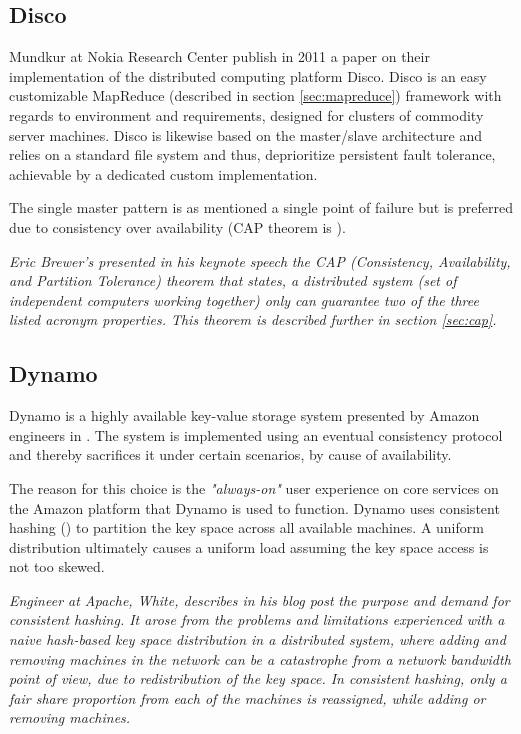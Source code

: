 \subsection*{Disco}
Mundkur \etal at Nokia Research Center publish in 2011 a paper on their implementation of the distributed computing platform Disco\cite{PageDisco}\cite{Mundkur:2011:DCP:2034654.2034670}. Disco is an easy customizable MapReduce (described in section \ref{sec:mapreduce}) framework with regards to environment and requirements, designed for clusters of commodity server machines. Disco is likewise based on the master/slave architecture and relies on a standard file system and thus, deprioritize persistent fault tolerance, achievable by a dedicated custom implementation. 

The single master pattern is as mentioned a single point of failure but is preferred due to consistency over availability (CAP theorem is ).
\vspace*{5mm}

\begin{definition} \label{def:cap}
\textit{Eric Brewer's presented in his keynote speech}\cite{Brewer2000} \textit{the CAP (Consistency, Availability, and Partition Tolerance) theorem that states, a distributed system (set of independent computers working together) only can guarantee two of the three listed acronym properties. This theorem is described further in section \ref{sec:cap}.}
\end{definition}

\subsection*{Dynamo}
Dynamo is a highly available key-value storage system presented by Amazon engineers in \cite{DeCandia:2007:DAH:1294261.1294281}. The system is implemented using an eventual consistency protocol and thereby sacrifices it under certain scenarios, by cause of availability. 

The reason for this choice is the \textit{"always-on"} user experience on core services on the Amazon platform that Dynamo is used to function. Dynamo uses consistent hashing () to partition the key space across all available machines. A uniform distribution ultimately causes a uniform load assuming the key space access is not too skewed.
\vspace*{3mm}

\begin{definition} \label{def:ch}
\textit{Engineer at Apache, White, describes in his blog post} \cite{PageWhiteCH} \textit{the purpose and demand for consistent hashing. It arose from the problems and limitations experienced with a naive hash-based key space distribution in a distributed system, where adding and removing machines in the network can be a catastrophe from a network bandwidth point of view, due to redistribution of the key space. In consistent hashing, only a fair share proportion from each of the machines is reassigned, while adding or removing machines.}
\end{definition}

